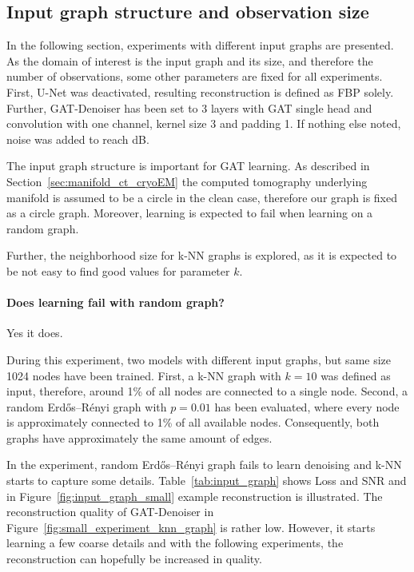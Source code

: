  \subsection{Input graph structure and observation size}
  In the following section, experiments with different input graphs are presented.
  As the domain of interest is the input graph and its size, and therefore the number of observations, 
  some other parameters are fixed for all experiments.
  First, U-Net was deactivated, resulting reconstruction is defined as FBP solely.
  Further, GAT-Denoiser has been set to 3 layers with GAT single head and convolution 
  with one channel, kernel size 3 and padding 1. 
  If nothing else noted, noise was added to reach  dB.

  The input graph structure is important for GAT learning. As described in Section~\ref{sec:manifold_ct_cryoEM}
  \textit{} the computed tomography underlying manifold is assumed to be a circle 
  in the clean case, therefore our graph is fixed as a circle graph. 
  Moreover, learning is expected to fail when learning on a random graph.

  Further, the neighborhood size for k-NN graphs is explored, as it is expected to be not easy to find 
  good values for parameter $k$.

  \paragraph{Does learning fail with random graph?}
  Yes it does.

  During this experiment, two models with different input graphs, but same size 1024 nodes have been trained.
  First, a k-NN graph with $k=10$ was defined as input, therefore, around 1\%  of all nodes are connected to a single node.
  Second, a random Erdős–Rényi graph with $p=0.01$ has been evaluated, where every node is 
  approximately connected to 1\% of all available nodes. Consequently, both graphs have approximately the same amount of edges.
  
  In the experiment, random Erdős–Rényi graph fails to learn denoising and k-NN starts to capture some details.
  Table~\ref{tab:input_graph} shows Loss and SNR and in Figure~\ref{fig:input_graph_small} example reconstruction is illustrated.
  The reconstruction quality of GAT-Denoiser in Figure~\ref{fig:small_experiment_knn_graph} is rather low. 
  However, it starts learning a few coarse details and with the following experiments, the reconstruction can hopefully be 
  increased in quality.


